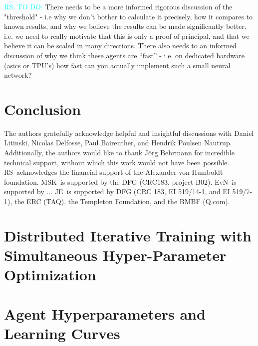 \documentclass[twocolumn,preprintnumbers,amsmath,amssymb,notitlepage,nofootinbib,longbibliography,superscriptaddress,aps,pra,10pt]{revtex4-1}
\newcommand{\ryan}[1]{\textcolor{cyan}{RS: #1}}
\begin{document}
	\ryan{TO DO:} There needs to be a more informed rigorous discussion of the "threshold" - i.e why we don't bother to calculate it precisely, how it compares to known results, and why we believe the results can be made significantly better.
	i.e. we need to really motivate that this is only a proof of principal, and that we believe it can be scaled in many directions.
	There also needs to an informed discussion of why we think these agents are ``fast'' - i.e. on dedicated hardware (asics or TPU's) how fast can you actually implement such a small neural network?

\section{Conclusion}\label{s:conclusions}

	\begin{acknowledgments}
		The authors gratefully acknowledge helpful and insightful discussions with Daniel Litinski, Nicolas Delfosse, Paul Baireuther, and Hendrik Poulsen Nautrup.
		Additionally, the authors would like to thank J\"{o}rg Behrmann for incredible technical support, without which this work would not have been possible.
		RS\ acknowledges the financial support of the Alexander von Humboldt foundation.
		MSK\ is supported by the DFG (CRC183, project B02).
		EvN\ is supported by ...
		JE\ is supported by DFG (CRC 183, EI 519/14-1, and EI 519/7-1), the ERC (TAQ), the Templeton Foundation, and the BMBF (Q.com).
	\end{acknowledgments}

\appendix

\section{Distributed Iterative Training with Simultaneous Hyper-Parameter Optimization}\label{A:training}

\section{Agent Hyperparameters and Learning Curves}\label{A:parameters}

	
	
\end{document}
